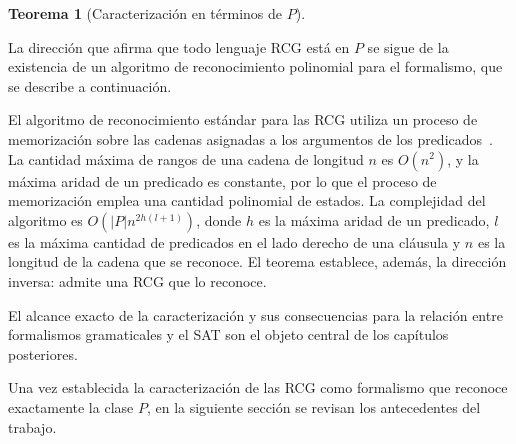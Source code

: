 \documentclass{report}
\theoremstyle{definition}
\theoremstyle{plain}
\newtheorem{teorema}{Teorema}[chapter]
\theoremstyle{remark}
\begin{document}
\begin{teorema}[Caracterización en términos de $P$]
  \label{teo:prcg-ptime}
\end{teorema}

La dirección que afirma
que todo lenguaje RCG está en $P$ se sigue de la existencia de un
algoritmo de reconocimiento polinomial para el formalismo, que se
describe a continuación.

El algoritmo de reconocimiento estándar para las RCG utiliza un proceso
de memorización sobre las cadenas asignadas a los argumentos de los
predicados~\cite{boullier1998proposal}. La cantidad máxima de rangos de
una cadena de longitud $n$ es $O(n^2)$, y la máxima aridad de un predicado
es constante, por lo que el proceso de memorización emplea una cantidad
polinomial de estados. La complejidad del algoritmo es $O(|P|
  n^{2h(l+1)})$, donde $h$ es la máxima aridad de un predicado, $l$ es
la máxima cantidad de predicados en el lado derecho de una cláusula y
$n$ es la longitud de la cadena que se reconoce. El teorema establece,
además, la dirección inversa:  admite una RCG
que lo reconoce.

El alcance exacto
de la caracterización y sus consecuencias para la relación entre
formalismos gramaticales y el SAT son el objeto
central de los capítulos posteriores.

Una vez establecida la caracterización de las RCG como formalismo que
reconoce exactamente la clase $P$, en la siguiente sección se
revisan los antecedentes del trabajo.
\end{document}
